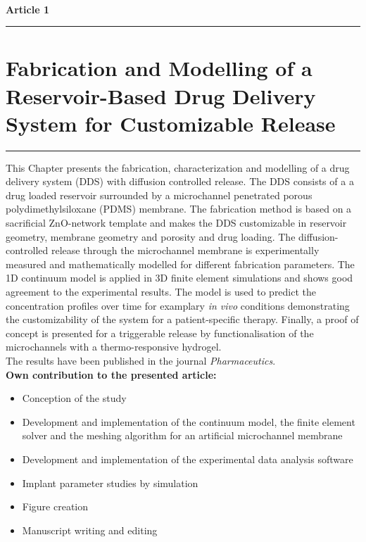 \ \vspace{1cm} \\
\Large {\bf Article 1}
\normalsize
\vspace{0.3cm}
\hrule
\section*{\Large \centering Fabrication and Modelling of a Reservoir-Based Drug Delivery
System for Customizable Release}
\vspace{0.3cm}
\hrule
\vspace{1.5cm}

This Chapter presents the fabrication, characterization and modelling of a drug delivery system (DDS) with diffusion controlled release. The DDS consists of a a drug loaded reservoir surrounded by a microchannel penetrated porous polydimethylsiloxane (PDMS) membrane. The fabrication method is based on a sacrificial ZnO-network template and makes the DDS customizable in reservoir geometry, membrane geometry and porosity and drug loading. The diffusion-controlled release through the microchannel membrane is experimentally measured and mathematically modelled for different fabrication parameters. The 1D continuum model is applied in 3D finite element simulations and shows good agreement to the experimental results. The model is used to predict the concentration profiles over time for examplary \textit{in vivo} conditions demonstrating the customizability of the system for a patient-specific therapy. Finally, a proof of concept is presented for a triggerable release by functionalisation of the microchannels with a thermo-responsive hydrogel. \\

The results have been published in the journal \textit{Pharmaceutics}.\\

\textbf{Own contribution to the presented article:}
\begin{itemize}
\item Conception of the study
\item Development and implementation of the continuum model, the finite element solver and the meshing algorithm for an artificial microchannel membrane
\item Development and implementation of the experimental data analysis software 
\item Implant parameter studies by simulation  
\item Figure creation 
\item Manuscript writing and editing
\end{itemize}

